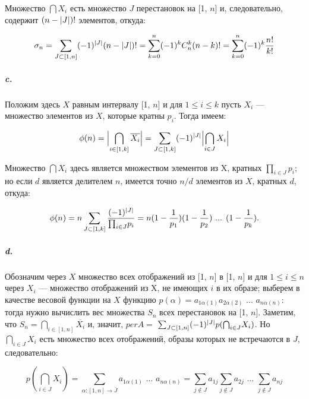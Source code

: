 \documentclass{../../template/mai_book}
\DeclarePairedDelimiter{\abs}{\lvert}{\rvert}
\begin{document}
\noindent
Множество $\bigcap X_i$ есть множество $J$ перестановок на [1, $n$] и, следовательно, содержит $(n - \abs{J})!$ элементов, откуда:

\begin{equation*}
\sigma_n = \sum_{J \subset [1, n]} (-1)^{\abs{J}} (n - \abs{J})! = \sum_{k = 0}^n (-1)^k C_n^k(n - k)! = \sum_{k = 0}^n (-1)^k \frac{n!}{k!}
\end{equation*}

\newpage


\subparagraph{c.} Положим здесь $X$ равным интервалу [1, $n$] и для $1 \leqslant i \leqslant k$ пусть $X_i$ — множество элементов из $X$, которые кратны $p_i$. Тогда имеем:

\begin{equation*}
\phi(n) = \abs[\Big]{\bigcap_{i \in [1, k]} \overline{X_i}} = \sum_{J \subset [1, k]} (-1)^{\abs{J}} \abs[\Big]{\bigcap_{i \in J} X_i}
\end{equation*}

\noindent
Множество $\bigcap X_i$ здесь является множеством элементов из X, кратных ${\prod}_{i \in J} p_i$; но если $d$ является делителем $n$, имеется точно $n / d$ элементов из $X$, кратных $d$, откуда:

\begin{equation*}
\phi(n) = n \sum_{J \subset [1, k]} \frac{(-1)^{\abs{J}}}{{\prod}_{i \in J} p_i} = n (1 - \frac{1}{p_1}) (1 - \frac{1}{p_2}) \text{ ... } (1 - \frac{1}{p_k}).
\end{equation*}

\subparagraph{d.} Обозначим через $X$ множество всех отображений из [1, $n$] в [1, $n$] и для $1 \leqslant i \leqslant n$ через $X_i$ — множество отображений из X, не имеющих $i$ в их образе; выберем в качестве весовой функции на $X$ функцию $p(\alpha) = a_{1\alpha(1)} a_{2\alpha(2)} \text{ ... } a_{n\alpha(n)}$: тогда нужно вычислить вес множества $S_n$ всех перестановок на [1, $n$]. Заметим, что $S_n = {\bigcap}_{i \in [1, n]} \overline{X_i}$ и, значит, $per A =$ \linebreak ${\sum}_{J \subset [1, n]} (-1)^{\abs{J}} p({\bigcap}_{i \in J} X_i)$. Но ${\bigcap}_{i \in J} X_i$ есть множество всех отображений, образы которых не встречаются в $J$, следовательно:

\begin{equation*}
p(\bigcap_{i \in J} X_i) = \sum_{\alpha : [1, n] \rightarrow \overline{J}} a_{1\alpha(1)} \text{ ... } a_{n\alpha(n)} = \sum_{j \not\in J} a_{1j} \sum_{j \not\in J} a_{2j} \text{ ... } \sum_{j \not\in J} a_{nj}
\end{equation*}
\end{document}

